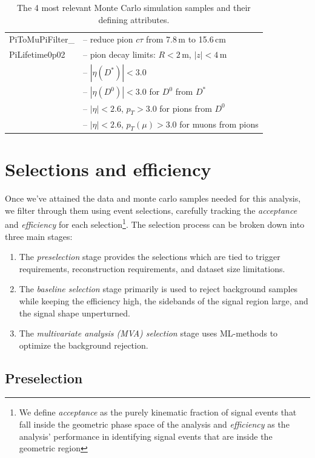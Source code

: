 \begin{table}
\begin{tabular}{|p{3.2cm}|p{12cm}|}
    PiToMuPiFilter\_ & -- reduce pion $c\tau$ from 7.8\,m to 15.6\,cm \\
    PiLifetime0p02 & -- pion decay limits: $R < 2$\,m, $|z| < 4$\,m \\
    & -- $|\eta(D^*)| < 3.0$ \\
    & -- $|\eta(D^0)| < 3.0$ for $D^0$ from $D^*$ \\
    & -- $|\eta| < 2.6$, $p_T > 3.0$ for pions from $D^0$ \\
    & -- $|\eta| < 2.6$, $p_T(\mu) > 3.0$ for muons from pions \\
    \hline
\end{tabular}
\caption{The 4 most relevant Monte Carlo simulation samples and their defining attributes.}
\label{tab:mc-samples}
\end{table}

\section{Selections and efficiency}

Once we've attained the data and monte carlo samples needed for this analysis, we filter through them using event selections, carefully tracking the \textit{acceptance} and \textit{efficiency} for each selection\footnote{We define \textit{acceptance} as the purely kinematic fraction of signal events that fall inside the geometric phase space of the analysis and \textit{efficiency} as the analysis' performance in identifying signal events that are inside the geometric region}. The selection process can be broken down into three main stages:
\begin{enumerate}
    \item The \textit{preselection} stage provides the selections which are tied to trigger requirements, reconstruction requirements, and dataset size limitations.
    \item The \textit{baseline selection} stage primarily is used to reject background samples while keeping the efficiency high, the sidebands of the signal region large, and the signal shape unperturned. 
    \item The \textit{multivariate analysis (MVA) selection} stage uses ML-methods to optimize the background rejection.
\end{enumerate}

\subsection{Preselection}
\label{subsec:preselection}

